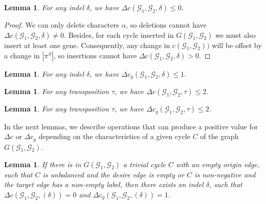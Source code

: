 \documentclass[12pt]{article}
\newtheorem{lemma}[theorem]{Lemma}
\begin{document}
\vspace{8pt}
\begin{lemma}\label{lemma:lb_d_c}
For any indel $\delta$, we have $\Delta c(\mathcal{G}_1,\mathcal{G}_2,\delta) \le 0$.
\end{lemma}

\begin{proof}
We can only delete characters $\alpha$, so deletions cannot have $\Delta c(\mathcal{G}_1,\mathcal{G}_2,\delta) \neq 0$. Besides, for each cycle inserted in $G(\mathcal{G}_1,\mathcal{G}_2)$ we must also insert at least one gene. Consequently, any change in $c(\mathcal{G}_1,\mathcal{G}_2))$ will be offset by a change in $|\pi^S|$, so insertions cannot have $\Delta c(\mathcal{G}_1,\mathcal{G}_2,\delta) > 0$.
\end{proof}

\vspace{8pt}
\begin{lemma}\cite[Lemma 3]{2021b-alexandrino-etal}\label{lemma:lb_d_cg}
For any indel $\delta$, we have $\Delta c_g(\mathcal{G}_1,\mathcal{G}_2,\delta) \le 1$.
\end{lemma}

\vspace{8pt}
\begin{lemma}\cite[Lemma 2.1]{1998-bafna-pevzner}\label{lemma:lb_t_c}
For any transposition $\tau$, we have $\Delta c(\mathcal{G}_1,\mathcal{G}_2,\tau) \le 2$.
\end{lemma}

\vspace{8pt}
\begin{lemma}\cite[Lemma 2]{2023b-alexandrino-etal}\label{lemma:lb_t_cg}
For any transposition $\tau$, we have $\Delta c_g(\mathcal{G}_1,\mathcal{G}_2,\tau) \le 2$.
\end{lemma}

In the next lemmas, we describe operations that can produce a positive value for $\Delta c$ or $\Delta c_g$ depending on the characteristics of a given cycle $C$ of the graph $G(\mathcal{G}_1,\mathcal{G}_2)$.

\vspace{8pt}
\begin{lemma}\cite[Lemma 5]{2021b-alexandrino-etal}\label{lemma:triv_1d}
If there is in $G(\mathcal{G}_1,\mathcal{G}_2)$ a trivial cycle $C$ with an empty origin edge, such that $C$ is unbalanced and the desire edge is empty or $C$ is non-negative and the target edge has a non-empty label, then there exists an indel $\delta$, such that $\Delta c(\mathcal{G}_1,\mathcal{G}_2,(\delta)) = 0$ and $\Delta c_g(\mathcal{G}_1,\mathcal{G}_2,(\delta)) = 1$.
\end{lemma}
\end{document}
